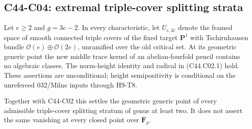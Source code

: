 \subsection{C44-C04: extremal triple-cover splitting strata}
\begin{theorem}[C44-C04]\label{thm:extremal-maroni}
Let $e\ge2$ and $g=3e-2$. In every characteristic, let $U_{e,2e}$
denote the framed space of smooth connected triple covers of the
fixed target $\mathbf P^1$ with Tschirnhausen bundle
$\mathcal O(e)\oplus\mathcal O(2e)$, unramified over the old
critical set. At its geometric generic point the new middle
trace kernel of an abelian-fourfold pencil contains no algebraic
classes. The norm-height identity and radical in (C44.C02.1) hold.
These assertions are unconditional; height semipositivity is
conditional on the unrefereed 032/Milne inputs through H9-T8.

Together with C44-C02 this settles the geometric generic point
of every admissible triple-cover splitting stratum of genus at
least two. It does not assert the same vanishing at every closed
point over $\overline{\mathbf F}_p$.
\end{theorem}
